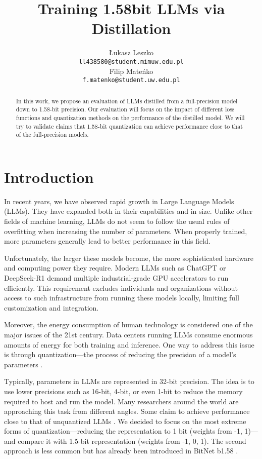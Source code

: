 \documentclass{article}
\title{Training 1.58bit LLMs via Distillation}
\author{Łukasz Leszko \\
	\texttt{ll438580@student.mimuw.edu.pl} \\
	\And
	Filip Mateńko \\
	\texttt{f.matenko@student.uw.edu.pl} \\
}
\begin{document}
\maketitle

\begin{abstract}
In this work, we propose an evaluation of LLMs distilled from a full-precision model down to 1.58-bit precision. Our evaluation will focus on the impact of different loss functions and quantization methods on the performance of the distilled model. We will try to validate claims that 1.58-bit quantization can achieve performance close to that of the full-precision models.
\end{abstract}




\section{Introduction}
In recent years, we have observed rapid growth in Large Language Models (LLMs). They have expanded both in their capabilities and in size. 
Unlike other fields of machine learning, LLMs do not seem to follow the usual rules of overfitting when increasing the number of 
parameters. When properly trained, more parameters generally lead to better performance in this field. 

Unfortunately, the larger these models become, the more sophisticated hardware and computing power they require. Modern LLMs such as 
ChatGPT or DeepSeek-R1 demand multiple industrial-grade GPU accelerators to run efficiently. This requirement excludes individuals and 
organizations without access to such infrastructure from running these models locally, limiting full customization and integration.

Moreover, the energy consumption of human technology is considered one of the major issues of the 21st century. Data centers running LLMs 
consume enormous amounts of energy for both training and inference. One way to address this issue is through quantization—the process of 
reducing the precision of a model's parameters \cite{quantizationtechniques}.

Typically, parameters in LLMs are represented in 32-bit precision. The idea is to use lower precisions such as 16-bit, 4-bit, 
or even 1-bit to reduce the memory required to host and run the model. Many researchers around the world are approaching this task from 
different angles. Some claim to achieve performance close to that of unquantized LLMs \cite{wang2023bitnetscaling1bittransformers}. We 
decided to focus on the most extreme forms of quantization—reducing the representation to 1 bit (weights from {-1, 1})—and compare it
with 1.5-bit representation (weights from {-1, 0, 1}). The second approach is less common but has already been introduced in BitNet 
b1.58 \cite{ma2024era1bitllmslarge}.
\end{document}
